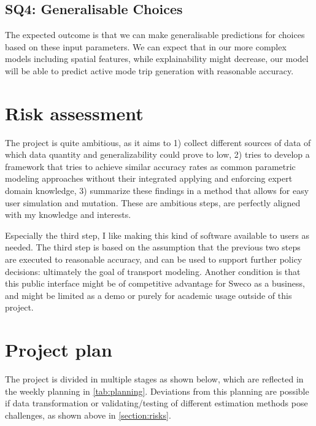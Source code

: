 \documentclass[sigconf, natbib=false, nonacm]{acmart}
\begin{document}
    \subsection{SQ4: Generalisable Choices}
    The expected outcome is that we can make generalisable predictions for choices based on these input parameters. We can expect that in our more complex models including spatial features, while explainability might decrease, our model will be able to predict active mode trip generation with reasonable accuracy. 

\section{Risk assessment}
    \label{section:risks}
    The project is quite ambitious, as it aims to 1) collect different sources of data of which data quantity and generalizability could prove to low, 2) tries to develop a framework that tries to achieve similar accuracy rates as common parametric modeling approaches without their integrated applying and enforcing expert domain knowledge, 3) summarize these findings in a method that allows for easy user simulation and mutation. These are ambitious steps, are perfectly aligned with my knowledge and interests. 
    
    Especially the third step, I like making this kind of software available to users as needed. The third step is based on the assumption that the previous two steps are executed to reasonable accuracy, and can be used to support further policy decisions: ultimately the goal of transport modeling. Another condition is that this public interface might be of competitive advantage for Sweco as a business, and might be limited as a demo or purely for academic usage outside of this project. 
	
\section{Project plan}
    \label{section:planning}
    The project is divided in multiple stages as shown below, which are reflected in the weekly planning in \autoref{tab:planning}. Deviations from this planning are possible if data transformation or validating/testing of different estimation methods pose challenges, as shown above in \autoref{section:risks}.
    
\end{document}
